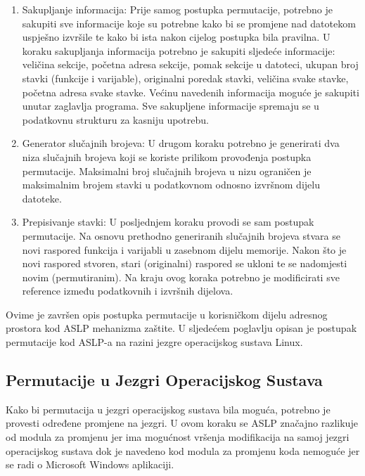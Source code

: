 \documentclass[times, utf8, diplomski, numeric]{fer}
\begin{document}
\begin{enumerate}
\item Sakupljanje informacija: Prije samog postupka permutacije,
potrebno je sakupiti sve informacije koje su potrebne kako bi se
promjene nad datotekom uspješno izvršile te kako bi ista nakon
cijelog postupka bila pravilna. U koraku sakupljanja informacija
potrebno je sakupiti sljedeće informacije: veličina sekcije,
početna adresa sekcije, pomak sekcije u datoteci, ukupan broj
stavki (funkcije i varijable), originalni poredak stavki,
veličina svake stavke, početna adresa svake stavke. Većinu
navedenih informacija moguće je sakupiti unutar zaglavlja
programa. Sve sakupljene informacije spremaju se u podatkovnu
strukturu za kasniju upotrebu.

\item Generator slučajnih brojeva: U drugom koraku potrebno je
generirati dva niza slučajnih brojeva koji se koriste prilikom
provođenja postupka permutacije. Maksimalni broj slučajnih
brojeva u nizu ograničen je maksimalnim brojem stavki u
podatkovnom odnosno izvršnom dijelu datoteke.

\item Prepisivanje stavki: U posljednjem koraku provodi se sam
postupak permutacije. Na osnovu prethodno generiranih slučajnih
brojeva stvara se novi raspored funkcija i varijabli u zasebnom
dijelu memorije. Nakon što je novi raspored stvoren, stari
(originalni) raspored se ukloni te se nadomjesti novim
(permutiranim). Na kraju ovog koraka potrebno je modificirati sve
reference između podatkovnih i izvršnih dijelova.

\end{enumerate}

Ovime je završen opis postupka permutacije u korisničkom dijelu
adresnog prostora kod ASLP mehanizma zaštite. U sljedećem
poglavlju opisan je postupak permutacije kod ASLP-a na razini
jezgre operacijskog sustava Linux.

\subsection{Permutacije u Jezgri Operacijskog Sustava}

Kako bi permutacija u jezgri operacijskog sustava bila moguća,
potrebno je provesti određene promjene na jezgri. U ovom koraku
se ASLP značajno razlikuje od modula za promjenu jer ima
mogućnost vršenja modifikacija na samoj jezgri operacijskog
sustava dok je navedeno kod modula za promjenu koda nemoguće jer
se radi o Microsoft Windows aplikaciji.
\end{document}
